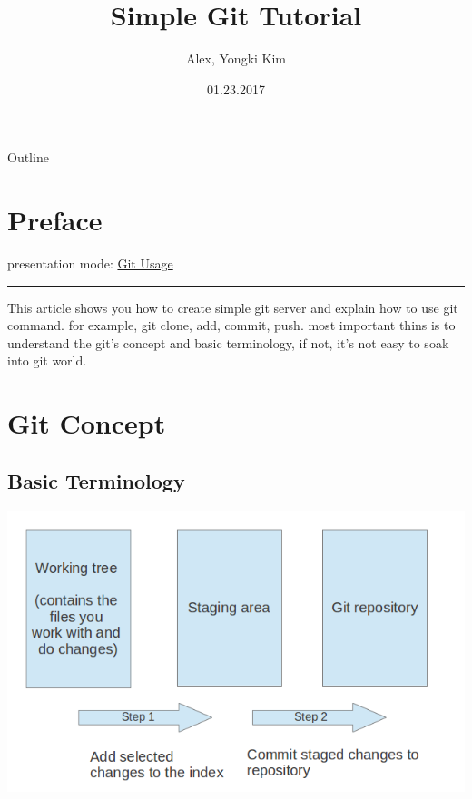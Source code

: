 \documentclass[bigger]{beamer}
\author{Alex, Yongki Kim}
\date{01.23.2017}
\title{Simple Git Tutorial}
\begin{document}
\maketitle
\begin{frame}{Outline}
\tableofcontents
\end{frame}


\section{Preface}
\label{sec:orgheadline1}
presentation mode: \href{./git_usage_20180113.html}{Git Usage}

\rule{\linewidth}{0.5pt}

This article shows you how to create simple git server and explain how to use git command.
for example, git clone, add, commit, push. 
most important thins is to understand the git's concept and basic terminology, if not, it's not easy to soak into git world.

\section{Git Concept}
\label{sec:orgheadline1}
\subsection{Basic Terminology}
\label{sec:orgheadline1}
\includegraphics[width=.9\linewidth]{./git-term.png}
\end{document}
